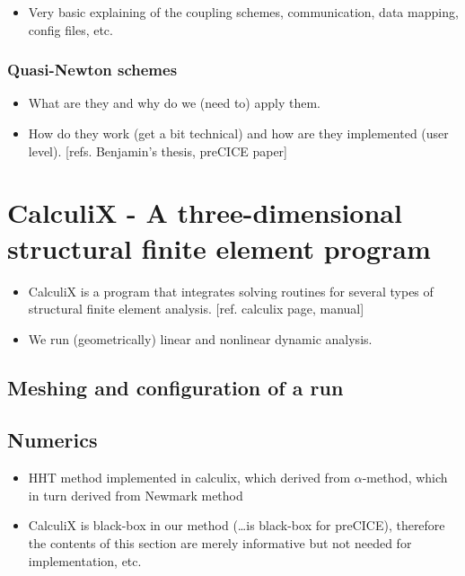 \documentclass[a4paper, 11pt, oneside]{Thesis}  %
\begin{document}
        \begin{itemize}
            \item Very basic explaining of the coupling schemes, communication, data mapping, config files, etc.
        \end{itemize}
        
            \subsubsection{Quasi-Newton schemes}
                \begin{itemize}
                    \item What are they and why do we (need to) apply them.
                    \item How do they work (get a bit technical) and how are they implemented (user level). [refs. Benjamin's thesis, preCICE paper]
                \end{itemize}
    
    
    \section{CalculiX - A three-dimensional structural finite element program}
    
        \begin{itemize}
            \item CalculiX is a program that integrates solving routines for several types of structural finite element analysis. [ref. calculix page, manual]
            \item We run (geometrically) linear and nonlinear dynamic analysis.
        \end{itemize}
    
        \subsection{Meshing and configuration of a run}
    
        \subsection{Numerics}
        
            \begin{itemize}
                \item HHT method implemented in calculix, which derived from $\alpha$-method, which in turn derived from Newmark method
                \item CalculiX is black-box in our method (\ldots is black-box for preCICE), therefore the contents of this section are merely informative but not needed for implementation, etc.
            \end{itemize}
        
\end{document}
